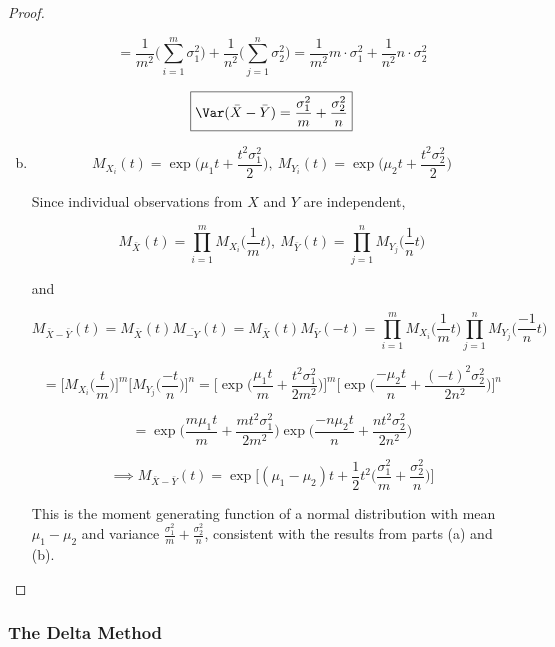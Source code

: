 \begin{proof}
\begin{enumerate}[a.]
\[
= \frac{1}{m^2 }\bigg(\sum_{i=1}^m \sigma_1^2 \bigg) + \frac{1}{n^2} \bigg(  \sum_{j=1}^n \sigma_2^2 \bigg) = \frac{1}{m^2}m \cdot \sigma_1^2 + \frac{1}{n^2} n \cdot \sigma_2^2
\]

\[
\boxed{
\Var (\bar{X} - \bar{Y}) = \frac{\sigma_1^2}{m} + \frac{\sigma_2^2}{n} }
\]

\item

\[
M_{X_i}(t) = \exp\bigg(\mu_1 t + \frac{t^2 \sigma_1^2}{2} \bigg), \ M_{Y_i}(t) = \exp\bigg(\mu_2 t + \frac{t^2 \sigma_2^2}{2} \bigg)
\]

Since individual observations from \(X\) and \(Y\) are independent,

\[
M_{\bar{X}}(t) = \prod_{i=1}^m M_{X_i}\bigg(\frac{1}{m}t\bigg), \ M_{\bar{Y}}(t) = \prod_{j=1}^n M_{Y_j}\bigg(\frac{1}{n}t\bigg)
\]

and

\[
M_{\bar{X} - \bar{Y}}(t) = M_{\bar{X}}(t) M_{\bar{-Y}}(t) = M_{\bar{X}}(t) M_{\bar{Y}}(-t) = \prod_{i=1}^m M_{X_i}\bigg(\frac{1}{m}t\bigg) \prod_{j=1}^n M_{Y_j}\bigg(\frac{-1}{n}t\bigg)
\]

\[
= \bigg[ M_{X_i}\bigg(\frac{t}{m} \bigg) \bigg] ^m  \bigg[ M_{Y_j}\bigg( \frac{-t}{n} \bigg)  \bigg]^n = \bigg[ \exp\bigg(\frac{\mu_1 t}{m} + \frac{t^2 \sigma_1^2}{2m^2} \bigg) \bigg] ^m  \bigg[ \exp\bigg(\frac{-\mu_2 t}{n} + \frac{(-t)^2 \sigma_2^2}{2n^2} \bigg) \bigg]^n
\]

\[
= \exp\bigg(\frac{m \mu_1 t}{m} + \frac{m t^2 \sigma_1^2}{2m^2} \bigg)   \exp\bigg(\frac{-n \mu_2 t}{n} + \frac{n t^2 \sigma_2^2}{2n^2} \bigg)
\]

\[
\implies \boxed{
M_{\bar{X} - \bar{Y}}(t) = \exp \bigg[ (\mu_1 - \mu_2)t + \frac{1}{2}t^2 \bigg( \frac{\sigma_1^2}{m}  + \frac{\sigma_2^2}{n} \bigg) \bigg]}
\]

This is the moment generating function of a normal distribution with mean \( \mu_1 - \mu_2\) and variance \(\frac{\sigma_1^2}{m}  + \frac{\sigma_2^2}{n}\), consistent with the results from parts (a) and (b).



\end{enumerate}

\end{proof}

\subsubsection{The Delta Method}

